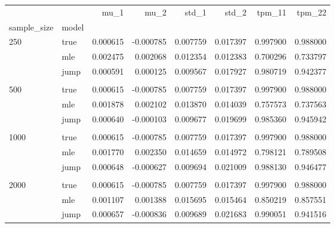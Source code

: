 \begin{tabular}{llrrrrrr}
\toprule
     &      &      mu\_1 &      mu\_2 &     std\_1 &     std\_2 &    tpm\_11 &    tpm\_22 \\
sample\_size & model &           &           &           &           &           &           \\
\midrule
250  & true &  0.000615 & -0.000785 &  0.007759 &  0.017397 &  0.997900 &  0.988000 \\
     & mle &  0.002475 &  0.002068 &  0.012354 &  0.012383 &  0.700296 &  0.733797 \\
     & jump &  0.000591 &  0.000125 &  0.009567 &  0.017927 &  0.980719 &  0.942377 \\
     \\
500  & true &  0.000615 & -0.000785 &  0.007759 &  0.017397 &  0.997900 &  0.988000 \\
     & mle &  0.001878 &  0.002102 &  0.013870 &  0.014039 &  0.757573 &  0.737563 \\
     & jump &  0.000640 & -0.000103 &  0.009677 &  0.019699 &  0.985360 &  0.945942 \\
     \\
1000 & true &  0.000615 & -0.000785 &  0.007759 &  0.017397 &  0.997900 &  0.988000 \\
     & mle &  0.001770 &  0.002350 &  0.014659 &  0.014972 &  0.798121 &  0.789508 \\
     & jump &  0.000648 & -0.000627 &  0.009694 &  0.021009 &  0.988130 &  0.946477 \\
     \\
2000 & true &  0.000615 & -0.000785 &  0.007759 &  0.017397 &  0.997900 &  0.988000 \\
     & mle &  0.001107 &  0.001388 &  0.015695 &  0.015464 &  0.850219 &  0.857551 \\
     & jump &  0.000657 & -0.000836 &  0.009689 &  0.021683 &  0.990051 &  0.941516 \\
\bottomrule
\end{tabular}
